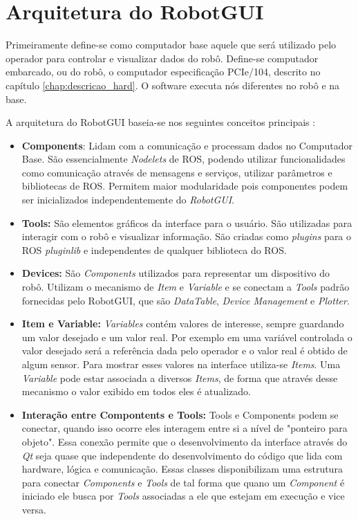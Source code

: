 \section{Arquitetura do RobotGUI}

Primeiramente define-se como computador base aquele que será utilizado pelo operador para controlar e visualizar dados do robô. Define-se computador embarcado, ou do robô, o computador especificação PCIe/104, descrito no capítulo \ref{chap:descricao_hard}. O software executa nós diferentes no robô e na base.

A arquitetura do RobotGUI baseia-se nos seguintes conceitos principais \citep{nunes2013doris}:

\begin{itemize}
\item \textbf{Components}: Lidam com a comunicação e processam dados no Computador Base. São essencialmente \textit{Nodelets} de ROS, podendo utilizar funcionalidades como comunicação através de mensagens e serviços, utilizar parâmetros e bibliotecas de ROS. Permitem maior modularidade pois componentes podem ser inicializados independentemente do \textit{RobotGUI}.

\item \textbf{Tools:} São elementos gráficos da interface para o usuário. São utilizadas para interagir com o robô e visualizar informação. São criadas como \textit{plugins} para o ROS \textit{pluginlib} e independentes de qualquer biblioteca do ROS.

\item \textbf{Devices:} São \textit{Components} utilizados para representar um dispositivo do robô. Utilizam o mecanismo de \textit{Item} e \textit{Variable} e se conectam a \textit{Tools} padrão fornecidas pelo RobotGUI, que são \textit{DataTable}, \textit{Device Management} e \textit{Plotter}. 

\item \textbf{Item e Variable:} \textit{Variables} contém valores de interesse, sempre guardando um valor desejado e um valor real. Por exemplo em uma variável controlada o valor desejado será a referência dada pelo operador e o valor real é obtido de algum sensor. Para mostrar esses valores na interface utiliza-se \textit{Items}. Uma \textit{Variable} pode estar associada a diversos \textit{Items}, de forma que através desse mecanismo o valor exibido em todos eles é atualizado. 

\item \textbf{Interação entre Compontents e Tools:} Tools e Components podem se conectar, quando isso ocorre eles interagem entre si a nível de "ponteiro para objeto". Essa conexão permite que o desenvolvimento da interface através do \textit{Qt} seja quase que independente do desenvolvimento do código que lida com hardware, lógica e comunicação. Essas classes disponibilizam uma estrutura para conectar \textit{Components} e \textit{Tools} de tal forma que quano um \textit{Component} é iniciado ele busca por \textit{Tools} associadas a ele que estejam em execução e vice versa. 


\end{itemize}
